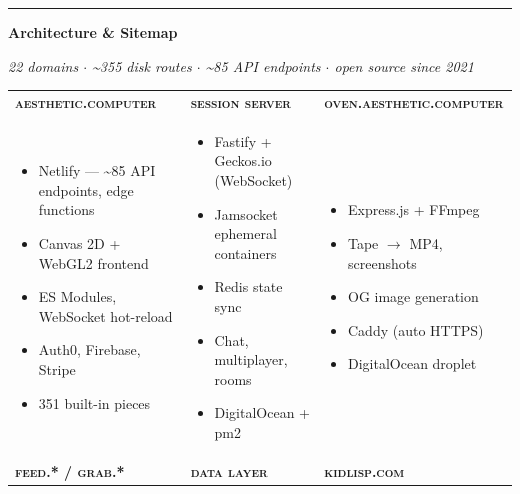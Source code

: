 \documentclass[10pt,letterpaper,twocolumn]{article}
\begin{document}

\rule{\textwidth}{2pt}
\vspace{0.3em}

\begin{center}
{\large\bfseries Architecture \& Sitemap}\par
\vspace{0.2em}
{\small\itshape 22 domains $\cdot$ \textasciitilde355 disk routes $\cdot$ \textasciitilde85 API endpoints $\cdot$ open source since 2021}
\end{center}

\vspace{0.3em}

{\small
\begin{tabularx}{\textwidth}{|X|X|X|}
\hline
\textbf{\textsc{aesthetic.computer}} & \textbf{\textsc{session server}} & \textbf{\textsc{oven.aesthetic.computer}} \\
\begin{itemize}[nosep,leftmargin=0.8em]
\item Netlify --- \textasciitilde85 API endpoints, edge functions
\item Canvas 2D + WebGL2 frontend
\item ES Modules, WebSocket hot-reload
\item Auth0, Firebase, Stripe
\item 351 built-in pieces
\end{itemize} &
\begin{itemize}[nosep,leftmargin=0.8em]
\item Fastify + Geckos.io (WebSocket)
\item Jamsocket ephemeral containers
\item Redis state sync
\item Chat, multiplayer, rooms
\item DigitalOcean + pm2
\end{itemize} &
\begin{itemize}[nosep,leftmargin=0.8em]
\item Express.js + FFmpeg
\item Tape $\rightarrow$ MP4, screenshots
\item OG image generation
\item Caddy (auto HTTPS)
\item DigitalOcean droplet
\end{itemize} \\
\hline
\textbf{\textsc{feed.* / grab.*}} & \textbf{\textsc{data layer}} & \textbf{\textsc{kidlisp.com}} \\

\end{tabularx}}
\end{document}
